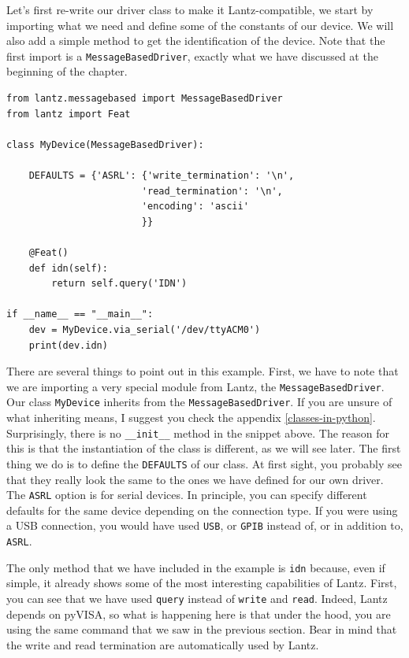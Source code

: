 Let's first re-write our driver class to make it Lantz-compatible, we
start by importing what we need and define some of the constants of our
device. We will also add a simple method to get the identification of the
device. Note that the first import is a \texttt{MessageBasedDriver},
exactly what we have discussed at the beginning of the chapter.

\begin{verbatim}
from lantz.messagebased import MessageBasedDriver
from lantz import Feat

class MyDevice(MessageBasedDriver):

    DEFAULTS = {'ASRL': {'write_termination': '\n',
                        'read_termination': '\n',
                        'encoding': 'ascii'
                        }}

    @Feat()
    def idn(self):
        return self.query('IDN')

if __name__ == "__main__":
    dev = MyDevice.via_serial('/dev/ttyACM0')
    print(dev.idn)
\end{verbatim}

There are several things to point out in this example. First, we have to
note that we are importing a very special module from Lantz, the
\texttt{MessageBasedDriver}. Our class \texttt{MyDevice} inherits from the
\texttt{MessageBasedDriver}. If you are unsure of what inheriting means,
I suggest you check the appendix \ref{classes-in-python}. Surprisingly, there is
no \texttt{__init__} method in the snippet above. The reason for this is that the instantiation of the class is different, as we will see later. The first thing we do is to
define the \texttt{DEFAULTS} of our class. At first sight, you probably
see that they really look the same to the ones we have defined for our own driver. The \texttt{ASRL} option is for serial devices. In principle, you can specify different defaults for the same device depending on the connection type. If you were using a {USB} connection, you would
have used \texttt{USB}, or \texttt{GPIB} instead of, or in
addition to, \texttt{ASRL}.

The only method that we have included in the example is \texttt{idn} because,
even if simple, it already shows some of the most interesting
capabilities of Lantz. First, you can see that we have used \texttt{query} instead
of \texttt{write} and \texttt{read}. Indeed, Lantz depends on pyVISA, so what is happening here is that under the hood, you are using the same command that we saw in the previous section. Bear in mind that the write and read termination are automatically used by Lantz. 

